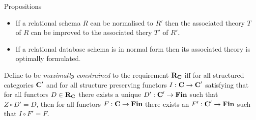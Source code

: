 \begin{frame}{Propositions}
\begin{itemize}
\item If a relational schema $R$ can be normalised to $R'$ then the associated theory $T$ of $R$ can be improved to the associated thery $T'$ of $R'$.

\item If a relational database schema is in normal form then its associated theory is optimally formulated.
\end{itemize}
\end{frame} 

\begin{frame}
\begin{definition}
Define \catcw to be \textit{maximally constrained} to the requirement $\textbf{R}_{\textbf{C}}$ iff 
for all structured categories $\textbf{C}'$ 
and for all structure preserving functors $I:\textbf{C} \rightarrow \textbf{C}'$ 
satisfying that for all functors $D \in \textbf{R}_{\textbf{C}}$ 
there exists a  unique $D' : \textbf{C}' \rightarrow \textbf{Fin}$ such that $Z \circ D'=D$,
then for all functors $F: \textbf{C} \rightarrow \textbf{Fin}$  
there exists an $F' : \textbf{C}' \rightarrow \textbf{Fin}$ such that $I \circ F'=F$.
\end{definition}
\end{frame}
